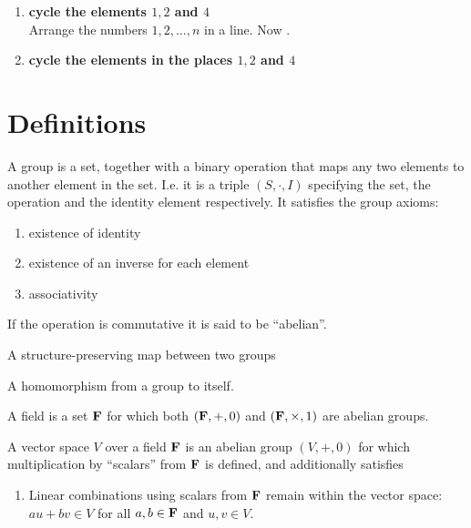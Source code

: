 \begin{enumerate}
\item {\bf cycle the elements $1, 2$ and $4$}\\
  Arrange the numbers $1, 2, \ldots, n$ in a line. Now .
\item {\bf cycle the elements in the places $1, 2$ and $4$}

\end{enumerate}






\section{Definitions}

\begin{definition*}[Group]
  A group is a set, together with a binary operation that maps any two elements
  to another element in the set. I.e. it is a triple $(S, \cdot, I)$ specifying
  the set, the operation and the identity element respectively. It satisfies the
  group axioms:
  \begin{enumerate}
  \item existence of identity
  \item existence of an inverse for each element
  \item associativity
  \end{enumerate}
  If the operation is commutative it is said to be ``abelian''.
\end{definition*}

\begin{definition*}[Homomorphism]
  A structure-preserving map between two groups
\end{definition*}

\begin{definition*}[Endomorphism]
  A homomorphism from a group to itself.
\end{definition*}

\begin{definition*}[Field]
  A field is a set $\mathbf{F}$ for which both $(\mathbf{F}, +, 0)$ and $(\mathbf{F}, \times, 1)$ are abelian groups.
\end{definition*}

\begin{definition*}
  A vector space $V$ over a field $\mathbf{F}$ is an abelian group $(V, +, 0)$ for which
  multiplication by ``scalars'' from $\mathbf{F}$ is defined, and additionally satisfies
  \begin{enumerate}
  \item Linear combinations using scalars from $\mathbf{F}$ remain within the vector
    space:\\
    $au + bv \in V$ for all $a, b \in \mathbf{F}$ and $u, v \in V$.
  \end{enumerate}
\end{definition*}

